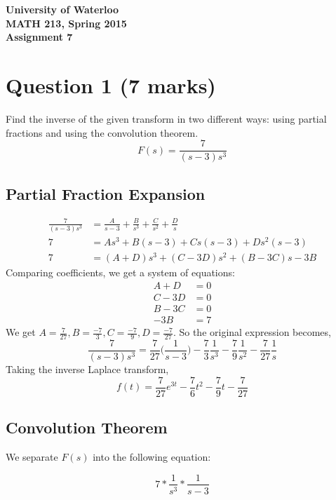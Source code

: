 \documentclass[12pt]{article}
\begin{document}
\begin{center}
{\Large\bf University of Waterloo}\\
\vspace{3mm}
{\Large\bf MATH 213, Spring 2015}\\
\vspace{2mm}
{\Large\bf Assignment 7}\\
\end{center}

\section*{Question 1 (7 marks)}
Find the inverse of the given transform in two different ways: using partial fractions and using the convolution theorem. $$F(s) = \frac{7}{(s-3)s^3}$$

\subsection*{Partial Fraction Expansion}
\begin{align*}
  \frac{7}{(s-3)s^3} &= \frac{A}{s-3} + \frac{B}{s^3} + \frac{C}{s^2} + \frac{D}{s} \\
  7 &= As^3 + B(s-3) + Cs(s-3) + Ds^2(s-3) \\
  7 &= (A+D)s^3 + (C-3D)s^2 + (B-3C)s - 3B
\end{align*}
Comparing coefficients, we get a system of equations:
\begin{align*}
  A+D &= 0 \\
  C-3D &= 0 \\
  B-3C &= 0 \\
  -3B &= 7
\end{align*}
We get $A=\frac{7}{27},B=\frac{-7}{3},C=\frac{-7}{9},D=\frac{-7}{27}$. So the original expression becomes, $$\frac{7}{(s-3)s^3}=\frac{7}{27}\bigg(\frac{1}{s-3}\bigg) - \frac{7}{3}\frac{1}{s^3} - \frac{7}{9}\frac{1}{s^2} - \frac{7}{27}\frac{1}{s}$$ Taking the inverse Laplace transform, $$f(t)=\frac{7}{27}e^{3t} - \frac{7}{6}t^2 - \frac{7}{9}t - \frac{7}{27}$$

\subsection*{Convolution Theorem}

We separate $F(s)$ into the following equation:

$$7 * \frac{1}{s^3} * \frac{1}{s-3}$$
\end{document}
